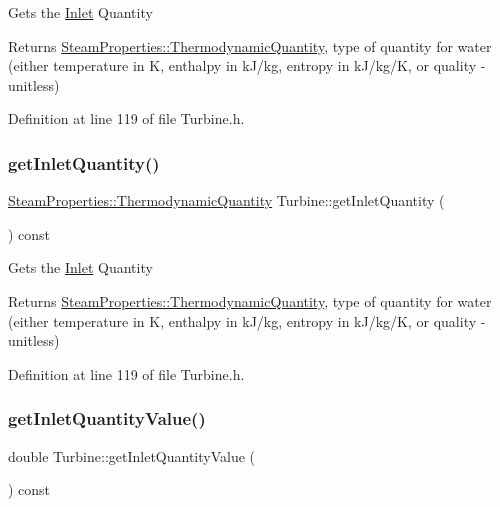 Gets the \hyperlink{class_inlet}{Inlet} Quantity

\begin{DoxyReturn}{Returns}
\hyperlink{class_steam_properties_ae0294bedf7d178c2d8fb6aed0f62fbff}{Steam\+Properties\+::\+Thermodynamic\+Quantity}, type of quantity for water (either temperature in K, enthalpy in k\+J/kg, entropy in k\+J/kg/K, or quality -\/ unitless) 
\end{DoxyReturn}


Definition at line 119 of file Turbine.\+h.

\mbox{\label{class_turbine_ac9e91d9539cea5cd1e0037c397c28c78}} 
\subsubsection{\texorpdfstring{get\+Inlet\+Quantity()}{getInletQuantity()}\hspace{0.1cm}{\footnotesize\ttfamily [3/3]}}
{\footnotesize\ttfamily \hyperlink{class_steam_properties_ae0294bedf7d178c2d8fb6aed0f62fbff}{Steam\+Properties\+::\+Thermodynamic\+Quantity} Turbine\+::get\+Inlet\+Quantity (\begin{DoxyParamCaption}{ }\end{DoxyParamCaption}) const\hspace{0.3cm}{\ttfamily [inline]}}

Gets the \hyperlink{class_inlet}{Inlet} Quantity

\begin{DoxyReturn}{Returns}
\hyperlink{class_steam_properties_ae0294bedf7d178c2d8fb6aed0f62fbff}{Steam\+Properties\+::\+Thermodynamic\+Quantity}, type of quantity for water (either temperature in K, enthalpy in k\+J/kg, entropy in k\+J/kg/K, or quality -\/ unitless) 
\end{DoxyReturn}


Definition at line 119 of file Turbine.\+h.

\mbox{\label{class_turbine_a3d8a3f317fa71abb3404144371615725}} 
\subsubsection{\texorpdfstring{get\+Inlet\+Quantity\+Value()}{getInletQuantityValue()}\hspace{0.1cm}{\footnotesize\ttfamily [1/3]}}
{\footnotesize\ttfamily double Turbine\+::get\+Inlet\+Quantity\+Value (\begin{DoxyParamCaption}{ }\end{DoxyParamCaption}) const\hspace{0.3cm}{\ttfamily [inline]}}


